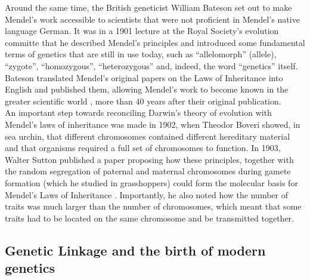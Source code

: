 Around the same time, the British geneticist William Bateson set out to make Mendel’s work accessible to scientists that were not proficient in Mendel’s native language German.
It was in a 1901 lecture at the Royal Society's evolution committe that he described Mendel's principles and introduced some fundamental terms of genetics that are still in use today, such as “allelomorph” (allele), “zygote”, “homozygous”, “heterozygous” and, indeed, the word “genetics” itself.
Bateson translated Mendel’s original papers on the Laws of Inheritance into English and published them, allowing Mendel’s work to become known in the greater scientific world \cite{bateson2013mendel}, more than 40 years after their original publication.\\ 

An important step towards reconciling Darwin’s theory of evolution with Mendel’s laws of inheritance was made in 1902, when Theodor Boveri showed, in sea urchin, that different chromosomes contained different hereditary material and that organisms required a full set of chromosomes to function. 
In 1903, Walter Sutton published a paper proposing how these principles, together with the random segregation of paternal and maternal chromosomes during gamete formation (which he studied in grasshoppers) could form the molecular basis for Mendel’s Laws of Inheritance \cite{sutton1903chromosomes}. 
Importantly, he also noted how the number of traits was much larger than the number of chromosomes, which meant that some traits had to be located on the same chromosome and be transmitted together.

\subsection{Genetic Linkage and the birth of modern genetics} %

